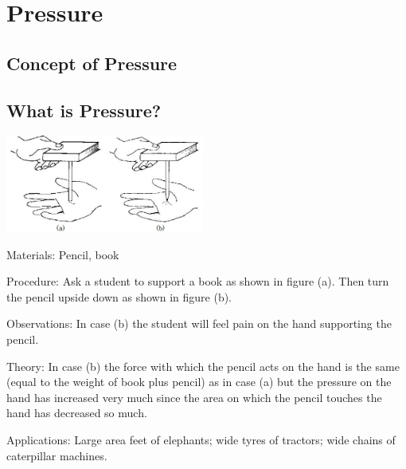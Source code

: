 \section{Pressure} 
\label{sec:pressure}

\begin{multicols}{2}


\section*{Concept of Pressure}


\subsection{What is Pressure?}

\begin{center}
\includegraphics[width=0.49\textwidth]{./img/source/pressure.jpg}
\end{center}

\begin{description*}
\item[Materials:]{Pencil, book}
\item[Procedure:]{Ask a student to support a book as shown in figure (a). Then turn the pencil upside down
as shown in figure (b).}
\item[Observations:]{In case (b) the student will feel pain on the hand supporting the pencil.}
\item[Theory:]{In case (b) the force with which the pencil acts on the hand is the same (equal to the
weight of book plus pencil) as in case (a) but the pressure on the hand has increased very
much since the area on which the pencil touches the hand has decreased so much.}
\item[Applications:]{Large area feet of elephants; wide tyres of tractors; wide chains of caterpillar machines.}
\end{description*}



\end{multicols}
